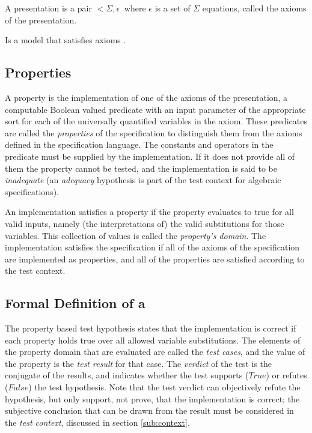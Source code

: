 {\begin{df}[Presentation]
A presentation is a pair $<\Sigma, \epsilon\>$ where
$\epsilon$ is a set of $\Sigma$ equations, called the axioms of the presentation.
\end{df}

\begin{df}
Is a model that satisfies axioms .
\end{df}

\subsection{Properties} \label{formal_pbt}

A property is the implementation of one of the axioms of the presentation,
a computable Boolean valued predicate with an input parameter of the appropriate sort
for each of the universally quantified variables in the axiom.
These predicates are called the \emph{properties} of the specification
to distinguish them from the axioms defined in the specification language.
The constants and operators in the predicate must be supplied by the implementation.
If it does not provide all of them the property cannot be tested,
and  the implementation is said to be \emph{inadequate}
(an \emph{adequacy} hypothesis is part of the test context for algebraic specifications).

An implementation satisfies a property if
the property evaluates to true for all valid inputs,
namely (the interpretations of) the valid subtitutions for those variables.
This collection of values is called the \emph{property's domain}.
The implementation satisfies the specification if 
all of the axioms of the specification are implemented as properties,
and all of the properties are satisfied according to the test context.

\subsection{Formal Definition of a \pbt}

The property based test hypothesis states that the implementation is correct
if each property holds true over all allowed variable substitutions.
The elements of the property domain that are evaluated
are called the \emph{test cases},
and the value of the property is the \emph{test result} for that case.
The \emph{verdict} of the test is the conjugate of the results,
and indicates whether the test supports ($True$) or refutes ($False$) the test hypothesis.
Note that the test verdict can objectively refute the hypothesis,
but only support, not prove, that the implementation is correct;
the subjective conclusion that can be drawn from the result must be considered in the \emph{test context},
discussed in section \ref{sub:context}.

}
